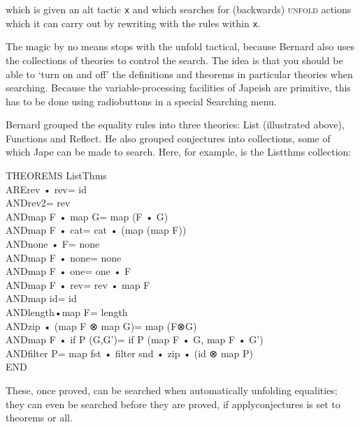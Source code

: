 which is given an alt tactic \texttt{x} and which searches for (backwards) \textsc{unfold} actions which it can carry out by rewriting with the rules within \texttt{x}.

The magic by no means stops with the unfold tactical, because Bernard also uses the collections of theories to control the search. The idea is that you should be able to `turn on and off' the definitions and theorems in particular theories when searching. Because the variable-processing facilities of Japeish are primitive, this has to be done using radiobuttons in a special Searching menu.

Bernard grouped the equality rules into three theories: List (illustrated above), Functions and Reflect. He also grouped conjectures into collections, some of which Jape can be made to search. Here, for example, is the Listthms collection:
\begin{japeish}
THEOREMS ListThms\\
ARE\tab rev • rev\tab = id\\
AND\tab rev2\tab = rev\\
AND\tab map F • map G\tab = map (F • G)\\
AND\tab map F • cat\tab = cat • (map (map F))\\
AND\tab none • F\tab = none\\
AND\tab map F • none\tab = none\\
AND\tab map F • one\tab = one • F\\
AND\tab map F • rev\tab = rev • map F\\
AND\tab map id\tab = id\\
AND\tab length•map F\tab = length\\
AND\tab zip • (map F ⊗ map G)\tab = map (F⊗G)\\
AND\tab map F • if P (G,G')\tab = if P (map F • G, map F • G')\\
AND\tab filter P\tab = map fst • filter snd • zip • (id ⊗ map P)\\
END
\end{japeish}

These, once proved, can be searched when automatically unfolding equalities; they can even be searched before they are proved, if applyconjectures is set to theorems or all.

